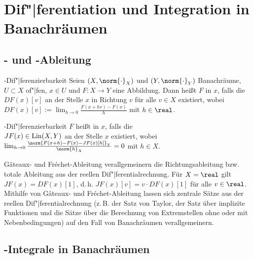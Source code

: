 \section{%
    Dif"|ferentiation und Integration in Banachräumen%
}

\subsection{%
    - und -Ableitung%
}

\begin{Def}{-Dif"|ferenzierbarkeit}
    Seien $(X, \norm{\cdot}_X)$ und $(Y, \norm{\cdot}_Y)$ Banachräume,
    $U \subset X$ of"|fen, $x \in U$ und $F\colon X \rightarrow Y$ eine Abbildung.
    Dann heißt $F$  in $x$,
    falls die  $DF(x)[v]$
    an der Stelle $x$ in Richtung $v$ für alle $v \in X$ existiert, wobei\\
    $DF(x)[v] := \lim_{h \to 0} \frac{F(x + hv) - F(x)}{h}$ mit $h \in \real$.
\end{Def}

\begin{Def}{-Dif"|ferenzierbarkeit}
    $F$ heißt  in $x$, falls die\\
     $JF(x) \in \operatorname{Lin}(X, Y)$
    an der Stelle $x$ existiert, wobei\\
    $\lim_{h \to 0} \frac{\norm{F(x + h) - F(x) - JF(x)[h]}_Y}{\norm{h}_X} = 0$ mit $h \in X$.
\end{Def}

\begin{Bem}
    Gâteaux- und Fréchet-Ableitung verallgemeinern die Richtungsableitung bzw. totale Ableitung
    aus der reellen Dif"|ferentialrechnung.
    Für $X = \real$ gilt $JF(x) = DF(x)[1]$,
    d.\,h. $JF(x)[v] = v \cdot DF(x)[1]$ für alle $v \in \real$.
    Mithilfe von Gâteaux- und Fréchet-Ableitung lassen sich zentrale Sätze aus der
    reellen Dif"|ferentialrechnung
    (z.\,B. der Satz von Taylor, der Satz über implizite Funktionen und die Sätze über die
    Berechnung von Extremstellen ohne oder mit Nebenbedingungen)
    auf den Fall von Banachräumen verallgemeinern.
\end{Bem}

\subsection{%
    -Integrale in Banachräumen
}

